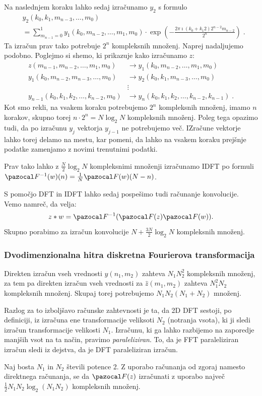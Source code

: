Na naslednjem koraku lahko sedaj izračunamo $y_2$ s formulo
\begin{align*}
  & y_2(k_0, k_1, m_{n-3},  \ldots, m_0)\\
  & = \sum_{m_{n-1}=0}^{1} y_1(k_0, m_{n-2},\ldots,m_1,m_0) \cdot \exp\left(-\frac{2\pi\imath (k_0 + k_1 2) 2^{n-2}m_{n-2}}{2^n}\right) \;.
\end{align*}
%
Ta izračun prav tako potrebuje $2^n$ kompleksnih množenj. Naprej nadaljujemo podobno. Poglejmo si shemo, ki prikazuje kako izračunamo $z$:
%
\begin{align*}
 z(m_{n-1}, m_{n-2}, \ldots, m_1, m_0) & \to y_1(k_0, m_{n-2}, \ldots, m_1, m_0) \\
 y_1(k_0, m_{n-2}, m_{n-3},\ldots, m_0) & \to y_2(k_0, k_1, m_{n-3}, \ldots, m_0) \\
 & \vdots \\
 y_{n-1}(k_0, k_1, k_2, \ldots, k_{n-2}, m_0) & \to y_n(k_0, k_1, k_2, \ldots, k_{n-2}, k_{n-1}) \;.
\end{align*}
%
Kot smo rekli, na vsakem koraku potrebujemo $2^n$ kompleksnih množenj, imamo $n$ korakov, skupno torej $n\cdot 2^n = N \log_2N$ kompleksnih množenj. Poleg tega opazimo tudi, da po izračunu $y_{j}$ vektorja $y_{j-1}$ ne potrebujemo več. IZračune vektorje lahko torej delamo na mestu, kar pomeni, da lahko na vsakem koraku prejšnje podatke zamenjamo z novimi trenutnimi podatki.

Prav tako lahko z $\frac{N}{2} \log_2N$ kompleksnimi množenji izračunamo IDFT po formuli $\F^{-1}(w)(n) = \frac{1}{N} \F(w)(N-n)$.

S pomočjo DFT in IDFT lahko sedaj pospešimo tudi računanje konvolucije. Vemo namreč, da velja:
$$z \ast w = \F^{-1}(\F(z)\F(w)).$$
Skupno porabimo za izračun konvolucije $N + \frac{3N}{2}\log_2N$ kompleksnih množenj.
%
\subsubsection{Dvodimenzionalna hitra diskretna Fourierova transformacija}
Direkten izračun vseh vrednosti $y(n_1, m_2)$ zahteva $N_1 N_2^2$ kompleksnih množenj, za tem pa direkten izračun vseh vrednosti za $\hat{z}(m_1, m_2)$ zahteva $N_1^2 N_2$ kompleksnih množenj. Skupaj torej potrebujemo $N_1 N_2 (N_1 + N_2)$ množenj.
%
\begin{opomba}
Razlog za to izboljšavo računske zahtevnosti je ta, da 2D DFT sestoji, po definiciji, iz izračuna ene transformacije veliksoti $N_2$ (notranja vsota), ki ji sledi izračun transformacije velikosti $N_1$.  Izračunu, ki ga lahko razbijemo na zaporedje manjših vsot na ta način, pravimo \emph{paraleliziran}. To, da je FFT paraleliziran izračun sledi iz dejstva, da je DFT paraleliziran izračun.
\end{opomba}
%
\begin{trditev}
Naj bosta $N_1$ in $N_2$ števili potence 2. Z uporabo računanja od zgoraj namesto direktnega računanja, se da $\F(z)$ izračunati z uporabo največ $\frac{1}{2} N_1 N_2 \log_2(N_1 N_2)$ kompleksnih množenj.  
\end{trditev}
%
